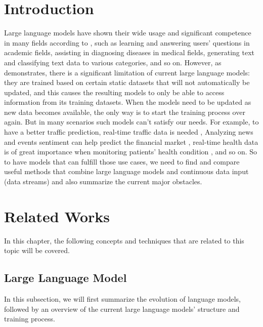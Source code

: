\documentclass[runningheads]{llncs}
\begin{document}
\section{Introduction}
Large language models have shown their wide usage and significant competence in many fields according to \cite{Liu23}, such as learning and answering users' questions in academic fields,
assisting in diagnosing diseases in medical fields, generating text and classifying text data to various categories, and so on. However, as \cite{Gupta23} demonstrates, 
there is a significant limitation of current large language models: they are trained based on certain static datasets that will not automatically be updated, and this causes the resulting models to only be able to access information from its training datasets. 
When the models need to be updated as new data becomes available, the only way is to start the training process over again. But in many scenarios such models can't satisfy our needs. 
For example, to have a better traffic prediction, real-time traffic data is needed \cite{Zhang24},
Analyzing news and events sentiment can help predict the financial market \cite{Araci19}, 
real-time health data is of great importance when monitoring patients' health condition \cite{Thiru23}, and so on.
So to have models that can fulfill those use cases, we need to find and compare useful methods that combine large language models and continuous data input (data streams) and also summarize the current major obstacles. 

\section{Related Works}
In this chapter, the following concepts and techniques that are related to this topic will be covered.

\subsection{Large Language Model}
In this subsection, we will first summarize the evolution of language models, followed by an overview of the current large language
models' structure and training process.    
  
\end{document}

